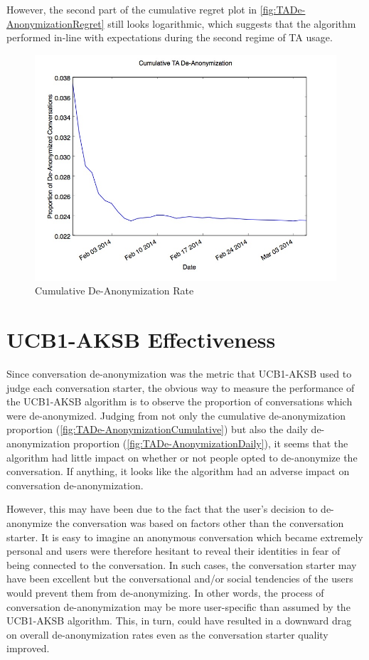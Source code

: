 However, the second part of the cumulative regret plot in \autoref{fig:TADe-AnonymizationRegret} still looks logarithmic, which suggests that the algorithm performed in-line with expectations during the second regime of TA usage.

\begin{figure}[H]
\centering
\includegraphics[trim= 0mm 0mm 0mm 0mm, clip, scale=0.5]{./Figures/CumulativeTADe-Anonymization.jpg}
\caption{Cumulative De-Anonymization Rate}
\label{fig:TADe-AnonymizationCumulative}
\end{figure}

\section{UCB1-AKSB Effectiveness}

Since conversation de-anonymization was the metric that UCB1-AKSB used to judge each conversation starter, the obvious way to measure the performance of the UCB1-AKSB algorithm is to observe the proportion of conversations which were de-anonymized. Judging from not only the cumulative de-anonymization proportion (\autoref{fig:TADe-AnonymizationCumulative}) but also the daily de-anonymization proportion (\autoref{fig:TADe-AnonymizationDaily}), it seems that the algorithm had little impact on whether or not people opted to de-anonymize the conversation. If anything, it looks like the algorithm had an adverse impact on conversation de-anonymization.

However, this may have been due to the fact that the user's decision to de-anonymize the conversation was based on factors other than the conversation starter. It is easy to imagine an anonymous conversation which became extremely personal and users were therefore hesitant to reveal their identities in fear of being connected to the conversation. In such cases, the conversation starter may have been excellent but the conversational and/or social tendencies of the users would prevent them from de-anonymizing. In other words, the process of conversation de-anonymization may be more user-specific than assumed by the UCB1-AKSB algorithm. This, in turn, could have resulted in a downward drag on overall de-anonymization rates even as the conversation starter quality improved.

